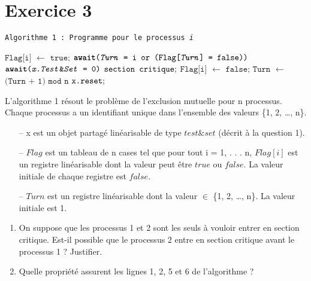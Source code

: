 \documentclass[10pt,a4paper]{article}
\newcommand*\Let[2]{\State #1 $\gets$ #2}
\begin{document}
\newpage 
\section*{Exercice 3}

\begin{tcolorbox}
\texttt{Algorithme 1 : Programme pour le processus \textit{i}}\\
  \begin{algorithmic}[1]
      \Let{$\texttt{Flag[i]}$}{$\texttt{true;}$}
      \State $\text{\texttt{\textbf{await}(\textit{Turn} = i \texttt{or} (Flag[\textit{Turn}] = false))}}$
      \State $\text{\texttt{\textbf{await}(\textit{x.Test}\&\textit{Set} = 0)}}$
      \State $\text{\texttt{section critique};}$
      \Let{$\texttt{Flag[i]}$}{$\texttt{false;}$}
         \Let{$\texttt{Turn}$}{$\texttt{(Turn + 1) mod n}$}
      \EndIf
      \State $\text{\texttt{x.reset};}$
  \end{algorithmic}
\end{tcolorbox}

L’algorithme 1 résout le problème de l’exclusion mutuelle pour n processus. Chaque processus a un identifiant unique dans l’ensemble des valeurs \{1, 2, \ldots , n\}.
\begin{itemize}
    \item[--] x est un objet partagé linéarisable de type $test\&set$ (décrit à la question 1).
    \item[--] $Flag$ est un tableau de n cases tel que pour tout i = 1, . . . n, $Flag[i]$ est un registre linéarisable dont la valeur peut être $true$ ou $false$. La valeur initiale de chaque registre est $false$.
    \item[--] $Turn$ est un registre linéarisable dont la valeur $\in$ \{1, 2, \ldots , n\}. La valeur initiale est 1.
\end{itemize}

\begin{enumerate}
    \item On suppose que les processus 1 et 2 sont les seuls à vouloir entrer en section critique. Est-il possible
que le processus 2 entre en section critique avant le processus 1 ? Justifier.
    \item Quelle propriété assurent les lignes 1, 2, 5 et 6 de l’algorithme ?
\end{enumerate}
\end{document}
